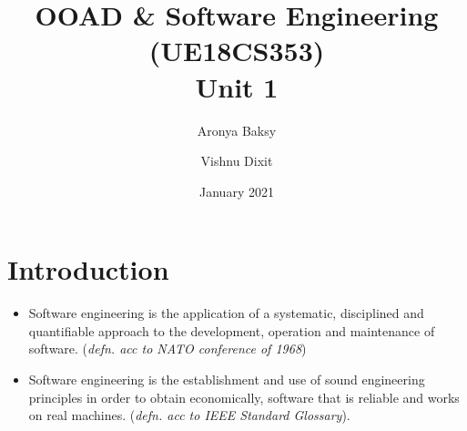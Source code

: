 \documentclass{article}
\title{OOAD \& Software Engineering (UE18CS353) \\
    Unit 1}
\author{Aronya Baksy \and Vishnu Dixit}
\date{January 2021}
\begin{document}
\maketitle

\section{Introduction}
\begin{itemize}
    \item Software engineering is the application of a systematic, disciplined and quantifiable approach to the development, operation and maintenance of software. (\textit{defn. acc to NATO conference of 1968})
    
    \item Software engineering is the establishment and use of sound engineering principles in order to obtain economically, software that is reliable and works on real machines. (\textit{defn. acc to IEEE Standard Glossary}). 
\end{itemize}
\end{document}
